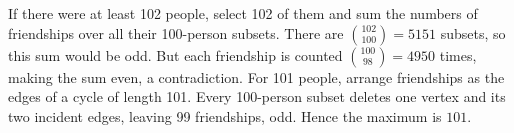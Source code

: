 If there were at least 102 people, select 102 of them and sum the numbers of friendships over all their 100-person subsets. There are $\binom{102}{100}=5151$ subsets, so this sum would be odd. But each friendship is counted $\binom{100}{98}=4950$ times, making the sum even, a contradiction. For 101 people, arrange friendships as the edges of a cycle of length 101. Every 100-person subset deletes one vertex and its two incident edges, leaving 99 friendships, odd. Hence the maximum is $\boxed{101}$.
